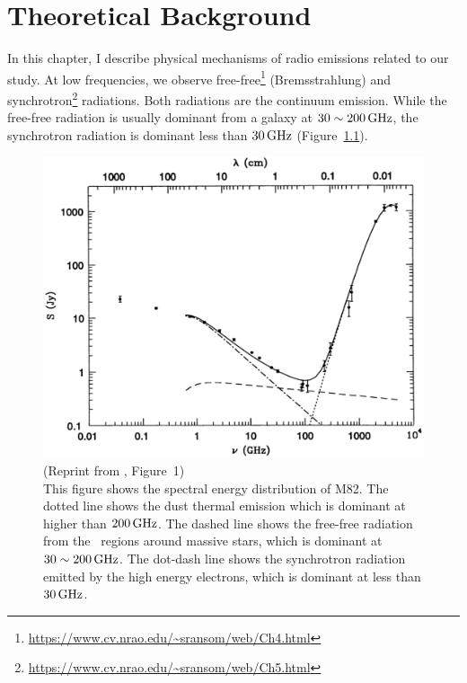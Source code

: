 \chapter{Theoretical Background}\label{chap:theory}
\begin{chapabstract}

    In this chapter, I describe physical mechanisms of radio emissions related to our study.
    At low frequencies, we observe free-free\footnote{\url{https://www.cv.nrao.edu/~sransom/web/Ch4.html}} (Bremsstrahlung) and synchrotron\footnote{\url{https://www.cv.nrao.edu/~sransom/web/Ch5.html}} radiations.
    Both radiations are the continuum emission.
    While the free-free radiation is usually dominant from a galaxy at $30 \sim 200\,\mathrm{GHz}$, the synchrotron radiation is dominant less than $30\,\mathrm{GHz}$ (Figure~\ref{fig:Condon1992_figure1}).\\ \vspace{0.2cm}
\begin{figure}[htbp]
	\centering
	\includegraphics[width=.7\linewidth]{Chapter_2/Figures/Condon1992_Figure1.png}
    \caption[Reprint from \citet{Condon1992a} (Figure~1)]{\label{fig:Condon1992_figure1}
        (Reprint from \citet{Condon1992a}, Figure~1)\\
        This figure shows the spectral energy distribution of M82.
        The dotted line shows the dust thermal emission which is dominant at higher than $200\,\mathrm{GHz}$.
        The dashed line shows the free-free radiation from the \ih~regions around massive stars, which is dominant at $30 \sim 200\,\mathrm{GHz}$.
        The dot-dash line shows the synchrotron radiation emitted by the high energy electrons, which is dominant at less than $30\,\mathrm{GHz}$.
    }
\end{figure}

\end{chapabstract}




